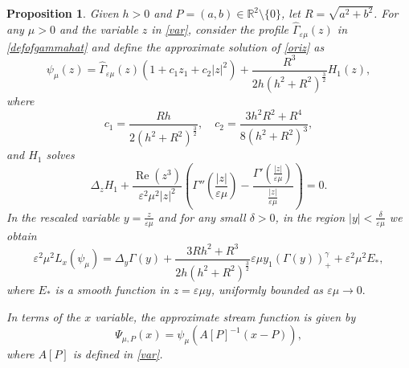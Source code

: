 \documentclass[11pt,reqno,a4paper]{amsart}
\numberwithin{equation}{section}
\newcommand{\R}{\mathbb{R}}
\newcommand{\ve}{\varepsilon}
\newtheorem{prop}{Proposition}[section]
\begin{document}
\begin{prop}\label{propapprox}
Given $h>0$ and $P=(a,b)\in\R^2\setminus\{0\}$, let $R=\sqrt{a^2+b^2}$. For any $\mu>0$ and the variable $z$ in \eqref{var}, consider the  profile $\widehat{\Gamma}_{\ve\mu}(z)$ in \eqref{defofgammahat} and define the approximate solution of \eqref{oriz}
as \[\psi_{\mu}(z)=  \widehat{\Gamma}_{\ve\mu}(z)\left(1+c_1z_1+c_2|z|^2\right) +\frac{R^3}{2h(h^2+R^2)^{\frac{3}{2}}}H_{1}(z),\]
where \[c_1=\frac{Rh}{2(h^2+R^2)^{\frac{3}{2}}}, \quad c_2=\frac{3h^2R^2+R^4}{8(h^2+R^2)^{3}},\]
and $H_1$ solves  \[\Delta_z H_{1} +\frac{\operatorname{Re}(z^3)}{\ve^2\mu^2|z|^2}\left(\Gamma''\left(\frac{|z|}{\ve\mu}\right)-\frac{\Gamma'\left(\frac{|z|}{\ve\mu}\right)}{\frac{|z|}{\ve\mu}}\right)=0.\]
In the rescaled variable $y=\frac{z}{\ve\mu}$ and for any small $\delta>0$, in the region $|y| < \frac{\delta}{\ve\mu}$ we obtain
\[\ve^2\mu^2L_{x}(\psi_{\mu})= \Delta_y\Gamma(y) + \frac{3Rh^2+R^3}{2h(h^2+R^2)^{\frac{3}{2}}}\ve\mu y_1\left(\Gamma(y)\right)^{\gamma}_{+} + \ve^2\mu^2 E_{*},\]
where $E_{*}$ is a smooth function in $z=\ve\mu y$, uniformly bounded as $\ve\mu \to 0.$

In terms of the $x$ variable, the approximate stream function is given by
\begin{equation}\label{approxinx}
    \Psi_{\mu,P}(x)=\psi_{\mu}\left(A[P]^{-1}\left(x-P\right)\right),
\end{equation}
where $A[P]$ is defined in \eqref{var}.
\end{prop}
\end{document}
